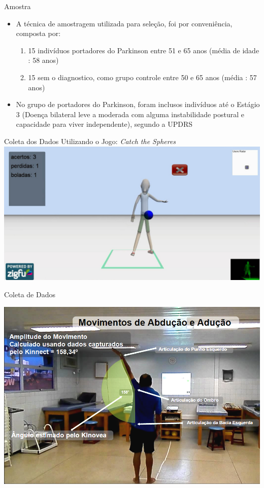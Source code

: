 \documentclass{beamer}
\begin{document}
\begin{frame}{Amostra} 
    \begin{block}{}
			\begin{itemize}
				\item A técnica de amostragem utilizada para seleção, foi por conveniência, composta por:
				\begin{enumerate}
					\item 15 indivíduos portadores do Parkinson entre 51 e 65 anos (média de idade : 58 anos)
					\item 15 sem o diagnostico, como grupo controle entre 50 e 65 anos (média : 57 anos)
				\end{enumerate}
					\item No grupo de portadores do Parkinson, foram inclusos indivíduos até o Estágio 3 (Doença bilateral leve a moderada com alguma instabilidade postural e capacidade para viver independente), segundo a UPDRS
				\end{itemize}
    \end{block}
\end{frame}
 
\begin{frame}{Coleta dos Dados Utilizando o Jogo: \textit{Catch the Spheres}}
      \center \includegraphics[height=2.2 in]{img/catch-the-spheres.png}
\end{frame}

\begin{frame}{Coleta de Dados}
  \begin{block}{}
  \center \includegraphics[height=2.4 in]{img/capturaducaokinnect.png} 
  \end{block}
\end{frame}
\end{document}
